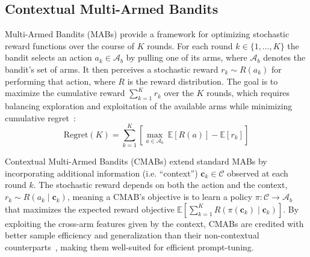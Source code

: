 \documentclass{article}
\begin{document}
\subsection{Contextual Multi-Armed Bandits}\label{sec:cmab}
Multi-Armed Bandits (MABs) provide a framework for optimizing stochastic reward functions over the course of $K$ rounds.
For each round $k \in \{ 1, \dots, K\}$ the bandit selects an action $a_k \in \mathcal{A}_b$ by pulling one of its arms, where $\mathcal{A}_b$ denotes the bandit's set of arms.
It then perceives a stochastic reward $r_k \sim R(a_k)$ for performing that action, where $R$ is the reward distribution. 
The goal is to maximize the cumulative reward $\sum_{k=1}^K r_k$ over the $K$ rounds, which requires balancing exploration and exploitation of the available arms while minimizing cumulative regret~\citep{auer2002finite}:
\begin{equation}
    \text{Regret}(K) = \sum_{k=1}^K \left[ \underset{a \in \mathcal{A}_b}{\max}\ \mathbb{E}[R(a)] - \mathbb{E}[r_k] \right]
\end{equation}

Contextual Multi-Armed Bandits (CMABs) extend standard MABs by 
incorporating additional information (i.e. ``context'') $\mathbf{c}_k \in \mathcal{C}$ observed at each round $k$. 
The stochastic reward depends on both the action and the context, $r_k \sim R(a_k \mid \mathbf{c}_k)$, meaning a CMAB's objective is to learn a policy $\pi: \mathcal{C} \to \mathcal{A}_b$ that maximizes the expected reward objective $\mathbb{E}[\sum_{k=1}^K R(\pi(\mathbf{c}_k) \mid \mathbf{c}_k)]$. 
By exploiting the cross-arm features given by the context, CMABs are credited with better sample efficiency and generalization than their non-contextual counterparts~\citep{li2010contextual}, making them well-suited for efficient prompt-tuning.
\end{document}
